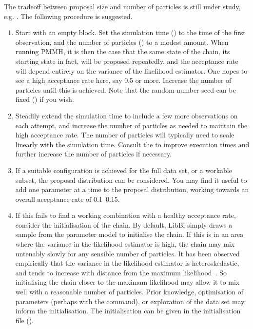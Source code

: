The tradeoff between proposal size and number of particles is still under
study, e.g. \citet{Doucet2013}. The following procedure is suggested.
\begin{enumerate}
\item Start with an empty  block. Set the
  simulation time () to the time of the first observation,
  and the number of particles () to a modest amount. When
  running PMMH, it is then the case that the same state of the chain, its
  starting state in fact, will be proposed repeatedly, and the acceptance rate
  will depend entirely on the variance of the likelihood estimator. One hopes
  to see a high acceptance rate here, say 0.5 or more. Increase the number of
  particles until this is achieved. Note that the random number seed can be
  fixed () if you wish.
\item Steadily extend the simulation time to include a few more observations
  on each attempt, and increase the number of particles as needed to maintain
  the high acceptance rate. The number of particles will typically need to
  scale linearly with the simulation time. Consult the  to improve execution times and further increase
  the number of particles if necessary.
\item If a suitable configuration is achieved for the full data set, or a
  workable subset, the proposal distribution can be considered. You may find
  it useful to add one parameter at a time to the proposal distribution,
  working towards an overall acceptance rate of 0.1--0.15.
\item If this fails to find a working combination with a healthy acceptance
  rate, consider the initialisation of the chain. By default, LibBi simply
  draws a sample from the parameter model to initialise the chain. If this is
  in an area where the variance in the likelihood estimator is high, the chain
  may mix untenably slowly for any sensible number of particles. It has been
  observed empirically that the variance in the likelihood estimator is
  heteroskedastic, and tends to increase with distance from the maximum
  likelihood~\citep{Murray2013a}. So initialising the chain closer to the
  maximum likelihood may allow it to mix well with a reasonable number of
  particles. Prior knowledge, optimisation of parameters (perhaps with the
   command), or exploration of the data set may inform the
  initialisation. The initialisation can be given in the initialisation file
  ().
\end{enumerate}

